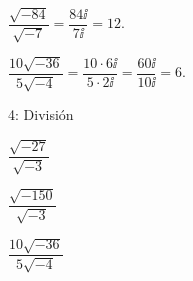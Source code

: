 
\begin{ejemplos}
  \item \(\dfrac{\sqrt{-84}}{\sqrt{-7}} = \dfrac{84\ii}{7\ii} = 12\).
  \item \(\dfrac{10\sqrt{-36}}{5\sqrt{-4}} = \dfrac{10\cdot 6\ii}{5\cdot 2\ii} = \dfrac{60\ii}{10\ii} = 6\).
\end{ejemplos}

\begin{actividad}{4: División}
  \item \(\dfrac{\sqrt{-27}}{\sqrt{-3}}\)
  \item \(\dfrac{\sqrt{-150}}{\sqrt{-3}}\)
  \item \(\dfrac{10\sqrt{-36}}{5\sqrt{-4}}\)
\end{actividad}